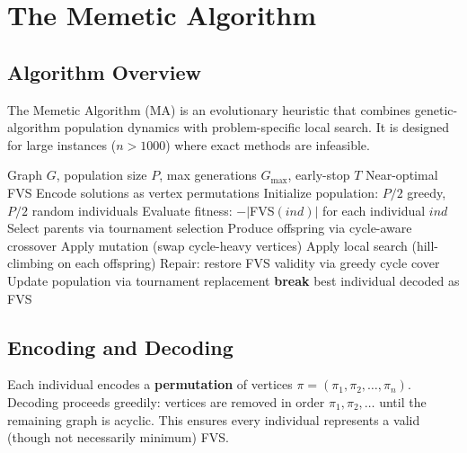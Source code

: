 \documentclass[10pt,a4paper]{report}
\theoremstyle{definition}
\newcommand{\fvs}{\textsc{FVS}}
\newcommand{\ma}{\textsc{MA}}
\begin{document}
\chapter{The Memetic Algorithm}
\label{ch:ma}

\section{Algorithm Overview}

The Memetic Algorithm (\ma{}) is an evolutionary heuristic that combines genetic-algorithm population dynamics with problem-specific local search. It is designed for large instances ($n > 1000$) where exact methods are infeasible.

\begin{algorithm}[H]
	\caption{Memetic Algorithm for \fvs{}}
	\label{alg:ma}
	\begin{algorithmic}[1]
		\Require Graph $G$, population size $P$, max generations $G_{\max}$, early-stop $T$
		\Ensure Near-optimal FVS
		\State Encode solutions as vertex permutations
		\State Initialize population: $P/2$ greedy, $P/2$ random individuals
		\State Evaluate fitness: $-|$FVS$(ind)|$ for each individual $ind$
		\State Select parents via tournament selection
		\State Produce offspring via cycle-aware crossover
		\State Apply mutation (swap cycle-heavy vertices)
		\State Apply local search (hill-climbing on each offspring)
		\State Repair: restore FVS validity via greedy cycle cover
		\State Update population via tournament replacement
		 \textbf{break} \EndIf
		\EndFor
		\Return best individual decoded as FVS
	\end{algorithmic}
\end{algorithm}

\section{Encoding and Decoding}

Each individual encodes a \textbf{permutation} of vertices $\pi = (\pi_1, \pi_2, \ldots, \pi_n)$. Decoding proceeds greedily: vertices are removed in order $\pi_1, \pi_2, \ldots$ until the remaining graph is acyclic. This ensures every individual represents a valid (though not necessarily minimum) FVS.
\end{document}
